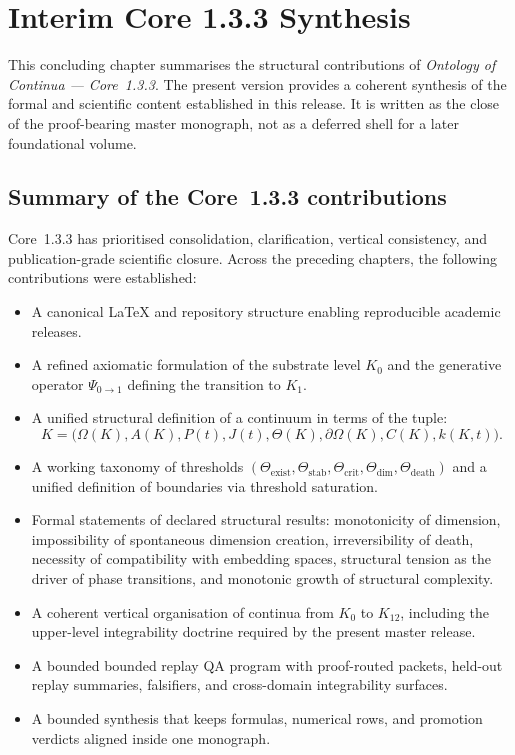 
\section{Interim Core 1.3.3 Synthesis}
\label{sec:conclusion}

This concluding chapter summarises the structural contributions of
\emph{Ontology of Continua --- Core~1.3.3}. The present version provides a
coherent synthesis of the formal and scientific content established in this
release. It is written as the close of the proof-bearing master monograph,
not as a deferred shell for a later foundational volume.

\subsection{Summary of the Core~1.3.3 contributions}

Core~1.3.3 has prioritised consolidation, clarification, vertical consistency,
and publication-grade scientific closure.
Across the preceding chapters, the following contributions were established:

\begin{itemize}
    \item A canonical \LaTeX{} and repository structure enabling reproducible academic releases.
    \item A refined axiomatic formulation of the substrate level \(K_0\) and the generative operator 
          \(\Psi_{0\to 1}\) defining the transition to \(K_1\).
    \item A unified structural definition of a continuum in terms of the tuple:
          \[
              K = \big(\Omega(K), A(K), P(t), J(t), \Theta(K), \partial\Omega(K), C(K), k(K,t)\big).
          \]
    \item A working taxonomy of thresholds 
          \((\Theta_{\mathrm{exist}}, \Theta_{\mathrm{stab}}, \Theta_{\mathrm{crit}}, 
            \Theta_{\mathrm{dim}}, \Theta_{\mathrm{death}})\) 
          and a unified definition of boundaries via threshold saturation.
    \item Formal statements of declared structural results:
          monotonicity of dimension,
          impossibility of spontaneous dimension creation,
          irreversibility of death,
          necessity of compatibility with embedding spaces,
          structural tension as the driver of phase transitions,
          and monotonic growth of structural complexity.
    \item A coherent vertical organisation of continua from \(K_0\) to \(K_{12}\),  
          including the upper-level integrability doctrine required by the present master release.
    \item A bounded bounded replay QA program with proof-routed packets, held-out replay summaries, falsifiers, and cross-domain integrability surfaces.
    \item A bounded synthesis that keeps formulas, numerical rows, and promotion verdicts aligned inside one monograph.
\end{itemize}

